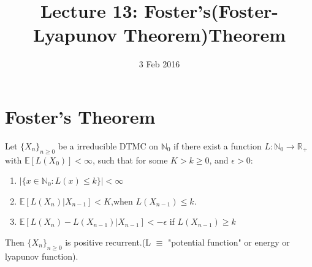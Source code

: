 \documentclass[a4paper,10pt,english]{article}
\title{Lecture 13: Foster's(Foster-Lyapunov Theorem)Theorem}
\date{3 Feb 2016}
\author{}
\begin{document}
\maketitle
\section{Foster's Theorem}
\begin{thm}[Foster,1950]
Let $\{X_n\}_{n \geq 0}$ be a irreducible DTMC on $\mathbb{N}_0$ if there exist a function $L : \mathbb{N}_0 \longrightarrow \mathbb{R}_+$ with $\mathbb{E}[L(X_0)] < \infty$, such that for some $K>k\geq0$, and $\epsilon>0$:
\begin{enumerate}
\item $|\{x \in \mathbb{N}_0 : L(x) \leq k\}| < \infty$
\item $\mathbb{E}[L(X_n)|X_{n-1}] < K$,when $L(X_{n-1}) \leq k$.
\item $\mathbb{E}[L(X_n)-L(X_{n-1})|X_{n-1}] < -\epsilon$ if $L(X_{n-1})\geq k$
\end{enumerate}
Then $\{X_n\}_{n \geq 0}$ is positive recurrent.(L $\equiv$ "potential function" or energy or lyapunov function).
\end{thm}
\end{document}
